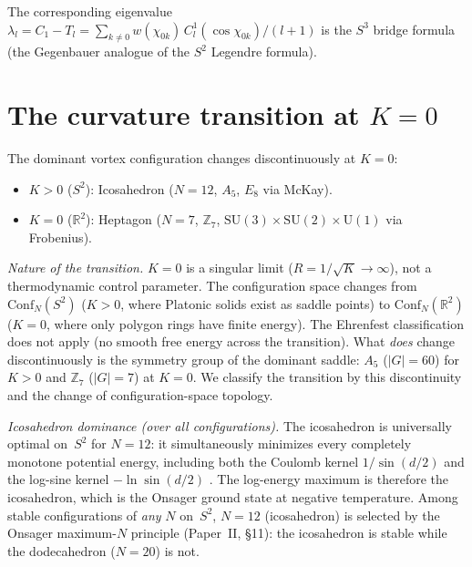 The corresponding eigenvalue
$\lambda_l = C_1 - T_l = \sum_{k \neq 0} w(\chi_{0k})\,
C_l^1(\cos\chi_{0k})/(l+1)$
is the $S^3$ bridge formula (the Gegenbauer analogue of the
$S^2$ Legendre formula).

\section{The curvature transition at $K = 0$}
\label{sec:phase-transition}

\begin{theorem}[Saddle-point transition at $K = 0$]\label{thm:phase-transition}
The dominant vortex configuration changes discontinuously at $K = 0$:
\begin{itemize}
\item $K > 0$ ($S^2$): Icosahedron ($N = 12$, $A_5$, $E_8$ via McKay).
\item $K = 0$ ($\mathbb{R}^2$): Heptagon ($N = 7$, $\mathbb{Z}_7$,
  $\mathrm{SU}(3) \times \mathrm{SU}(2) \times \mathrm{U}(1)$
  via Frobenius).
\end{itemize}
\end{theorem}

\emph{Nature of the transition.}\enspace
$K = 0$ is a singular limit ($R = 1/\sqrt{K} \to \infty$),
not a thermodynamic control parameter.
The configuration space changes from $\mathrm{Conf}_{N}(S^2)$
($K > 0$, where Platonic solids exist as saddle points) to
$\mathrm{Conf}_{N}(\mathbb{R}^2)$
($K = 0$, where only polygon rings have finite energy).
The Ehrenfest classification does not apply (no smooth
free energy across the transition).
What \emph{does} change discontinuously is the symmetry group
of the dominant saddle: $A_5$ ($|G| = 60$) for $K > 0$
and $\mathbb{Z}_7$ ($|G| = 7$) at $K = 0$.
We classify the transition by this discontinuity and
the change of configuration-space topology.

\emph{Icosahedron dominance (over all configurations).}\enspace
The icosahedron is universally optimal on~$S^2$ for $N = 12$:
it simultaneously minimizes every completely monotone potential
energy, including both the Coulomb kernel $1/\sin(d/2)$ and the
log-sine kernel $-\ln\sin(d/2)$
\citep{CohnKumar2007}.
The log-energy maximum is therefore the icosahedron,
which is the Onsager ground state at negative temperature.
Among stable configurations of \emph{any} $N$ on~$S^2$,
$N = 12$ (icosahedron) is selected by the Onsager
maximum-$N$ principle (Paper~II, \S11): the icosahedron is
stable while the dodecahedron ($N = 20$) is not.

